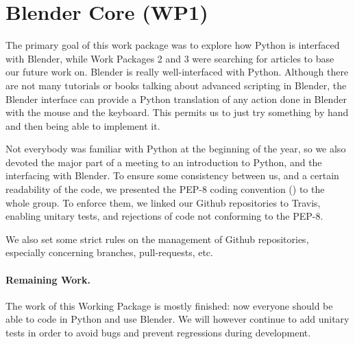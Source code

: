 \section{Blender Core (WP1)}

The primary goal of this work package was to explore how Python is interfaced with Blender, while Work Packages 2 and 3 were searching for articles to base our future work on. Blender is really well-interfaced with Python. Although there are not many tutorials or books talking about advanced scripting in Blender, the Blender interface can provide a Python translation of any action done in Blender with the mouse and the keyboard. This permits us to just try something by hand and then being able to implement it. 
\par Not everybody was familiar with Python at the beginning of the year, so we also devoted the major part of a meeting to an introduction to Python, and the interfacing with Blender. To ensure some consistency between us, and a certain readability of the code, we presented the PEP-8 coding convention (\cite{pep8}) to the whole group. To enforce them, we linked our Github repositories to Travis, enabling unitary tests, and rejections of code not conforming to the PEP-8.
\par We also set some strict rules on the management of Github repositories, especially concerning branches, pull-requests, etc.
\paragraph{Remaining Work.} The work of this Working Package is mostly finished: now everyone should be able to code in Python and use Blender. We will however continue to add unitary tests in order to avoid bugs and prevent regressions during development. 
